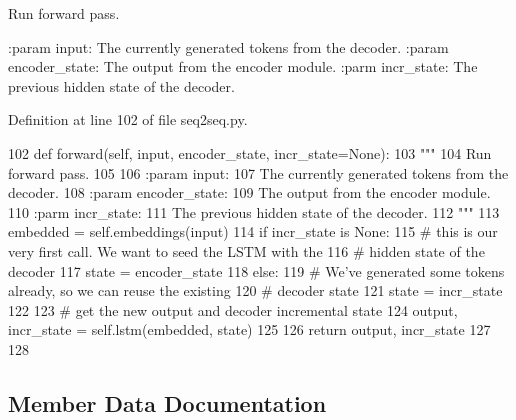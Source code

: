 \begin{DoxyVerb}Run forward pass.

:param input:
    The currently generated tokens from the decoder.
:param encoder_state:
    The output from the encoder module.
:parm incr_state:
    The previous hidden state of the decoder.
\end{DoxyVerb}
 

Definition at line 102 of file seq2seq.\+py.


\begin{DoxyCode}
102     \textcolor{keyword}{def }forward(self, input, encoder\_state, incr\_state=None):
103         \textcolor{stringliteral}{"""}
104 \textcolor{stringliteral}{        Run forward pass.}
105 \textcolor{stringliteral}{}
106 \textcolor{stringliteral}{        :param input:}
107 \textcolor{stringliteral}{            The currently generated tokens from the decoder.}
108 \textcolor{stringliteral}{        :param encoder\_state:}
109 \textcolor{stringliteral}{            The output from the encoder module.}
110 \textcolor{stringliteral}{        :parm incr\_state:}
111 \textcolor{stringliteral}{            The previous hidden state of the decoder.}
112 \textcolor{stringliteral}{        """}
113         embedded = self.embeddings(input)
114         \textcolor{keywordflow}{if} incr\_state \textcolor{keywordflow}{is} \textcolor{keywordtype}{None}:
115             \textcolor{comment}{# this is our very first call. We want to seed the LSTM with the}
116             \textcolor{comment}{# hidden state of the decoder}
117             state = encoder\_state
118         \textcolor{keywordflow}{else}:
119             \textcolor{comment}{# We've generated some tokens already, so we can reuse the existing}
120             \textcolor{comment}{# decoder state}
121             state = incr\_state
122 
123         \textcolor{comment}{# get the new output and decoder incremental state}
124         output, incr\_state = self.lstm(embedded, state)
125 
126         \textcolor{keywordflow}{return} output, incr\_state
127 
128 
\end{DoxyCode}


\subsection{Member Data Documentation}
\mbox{\label{classparlai_1_1agents_1_1examples_1_1seq2seq_1_1Decoder_aa0bc6e18f86e036101771cfe9c88a228}} 
